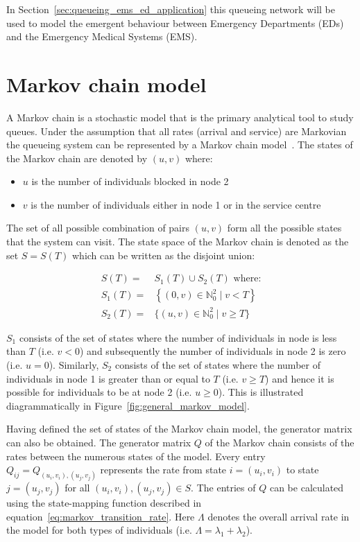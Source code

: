 In Section~\ref{sec:queueing_ems_ed_application} this queueing network will be
used to model the emergent behaviour between
Emergency Departments (EDs) and the Emergency Medical Systems (EMS).





\section{Markov chain model}

A Markov chain is a stochastic model that is the primary analytical tool to
study queues.
Under the assumption that all rates (arrival and service) are Markovian the
queueing system can be represented by a Markov chain
model~\cite{kemeny1976markov}.
The states of the Markov chain are denoted by \((u,v)\) where:

\begin{itemize}
    \item \(u\) is the number of individuals blocked in node 2
    \item \(v\) is the number of individuals either in node 1 or in the
    service centre
\end{itemize}

The set of all possible combination of pairs \((u, v)\) form all the possible
states that the system can visit.
The state space of the Markov chain is denoted as the set \(S=S(T)\) which can
be written as the disjoint union:

\begin{align}
    S(T) =& S_1(T) \cup S_2(T) \text{ where:} \nonumber \\
    S_1(T) =& \left\{(0, v)\in\mathbb{N}_0^2 \; | \; v < T \right\}
    \label{eq:definition_of_S_as_disjoint_union} \\
    S_2(T) =& \{(u, v)\in\mathbb{N}_0^2 \; | \; v \geq T \} \nonumber
\end{align}

\(S_1\) consists of the set of states where the number of individuals in node
is less than \(T\) (i.e. \(v < 0\)) and subsequently the number of
individuals in node 2 is zero (i.e. \(u = 0\)).
Similarly, \(S_2\) consists of the set of states where the number of individuals
in node 1 is greater than or equal to \(T\) (i.e. \(v \geq T\)) and
hence it is possible for individuals to be at node 2 (i.e.
\(u \geq 0\)).
This is illustrated diagrammatically in Figure~\ref{fig:general_markov_model}.

Having defined the set of states of the Markov chain model, the generator
matrix can also be obtained.
The generator matrix \(Q\) of the Markov chain consists of the
rates between the numerous states of the model.
Every entry \( Q_{ij} = Q_{(u_i, v_i),(u_j, v_j)} \) represents the rate from
state \( i = (u_i, v_i) \) to state \( j = (u_j , v_j) \) for all
\( (u_i, v_i), (u_j, v_j) \in S \).
The entries of \(Q\) can be calculated using the state-mapping function
described in equation~\eqref{eq:markov_transition_rate}.
Here \(\Lambda\) denotes the overall arrival rate in the model for
both types of individuals (i.e. \(\Lambda = \lambda_1 + \lambda_2\)).

